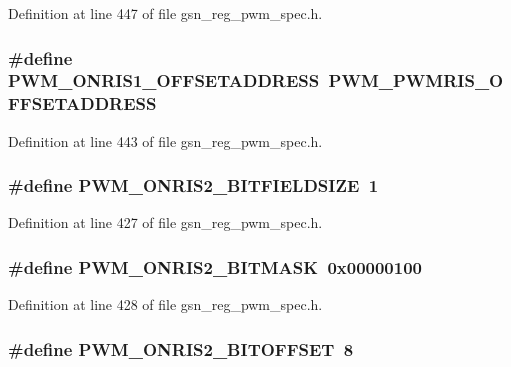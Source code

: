 Definition at line 447 of file gsn\_\-reg\_\-pwm\_\-spec.h.

\hypertarget{a00565_a48d8b9e83760dfe43c39030946285035}{
\subsubsection[{PWM\_\-ONRIS1\_\-OFFSETADDRESS}]{\setlength{\rightskip}{0pt plus 5cm}\#define PWM\_\-ONRIS1\_\-OFFSETADDRESS~PWM\_\-PWMRIS\_\-OFFSETADDRESS}}
\label{a00565_a48d8b9e83760dfe43c39030946285035}


Definition at line 443 of file gsn\_\-reg\_\-pwm\_\-spec.h.

\hypertarget{a00565_a17c7a2f0258dfa8c750292cb2ae87c6f}{
\subsubsection[{PWM\_\-ONRIS2\_\-BITFIELDSIZE}]{\setlength{\rightskip}{0pt plus 5cm}\#define PWM\_\-ONRIS2\_\-BITFIELDSIZE~1}}
\label{a00565_a17c7a2f0258dfa8c750292cb2ae87c6f}


Definition at line 427 of file gsn\_\-reg\_\-pwm\_\-spec.h.

\hypertarget{a00565_a98fe5375714720a916cc9441270e3f65}{
\subsubsection[{PWM\_\-ONRIS2\_\-BITMASK}]{\setlength{\rightskip}{0pt plus 5cm}\#define PWM\_\-ONRIS2\_\-BITMASK~0x00000100}}
\label{a00565_a98fe5375714720a916cc9441270e3f65}


Definition at line 428 of file gsn\_\-reg\_\-pwm\_\-spec.h.

\hypertarget{a00565_ac4dcfd05963a3ee28d5dcf09579bc69b}{
\subsubsection[{PWM\_\-ONRIS2\_\-BITOFFSET}]{\setlength{\rightskip}{0pt plus 5cm}\#define PWM\_\-ONRIS2\_\-BITOFFSET~8}}
\label{a00565_ac4dcfd05963a3ee28d5dcf09579bc69b}


